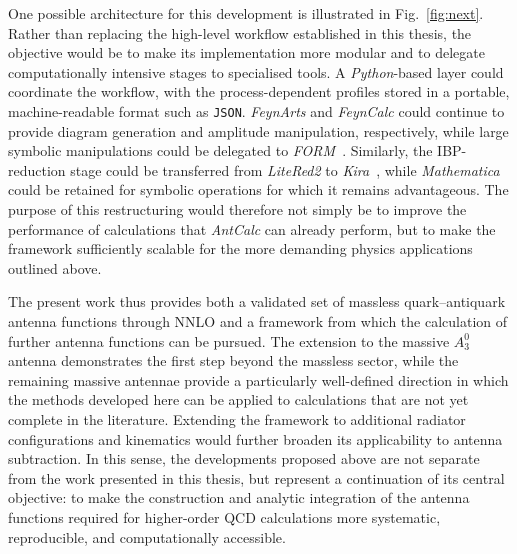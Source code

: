 One possible architecture for this development is illustrated in Fig.~\ref{fig:next}. Rather than
replacing the high-level workflow established in this thesis, the objective would be to make its
implementation more modular and to delegate computationally intensive stages to specialised tools. A
\textit{Python}-based layer could coordinate the workflow, with the process-dependent profiles stored
in a portable, machine-readable format such as \texttt{JSON}. \textit{FeynArts} and \textit{FeynCalc}
could continue to provide diagram generation and amplitude manipulation, respectively, while large
symbolic manipulations could be delegated to \textit{FORM}~\cite{Ruijl:2017dtg}. Similarly, the IBP-reduction stage could
be transferred from \textit{LiteRed2} to \textit{Kira}~\cite{Klappert:2020nbg}, while \textit{Mathematica} could be retained
for symbolic operations for which it remains advantageous. The purpose of this restructuring would
therefore not simply be to improve the performance of calculations that \textit{AntCalc} can already
perform, but to make the framework sufficiently scalable for the more demanding physics applications
outlined above.



The present work thus provides both a validated set of massless quark--antiquark antenna functions
through NNLO and a framework from which the calculation of further antenna functions can be pursued.
The extension to the massive $A_3^0$ antenna demonstrates the first step beyond the massless sector,
while the remaining massive antennae provide a particularly well-defined direction in which the
methods developed here can be applied to calculations that are not yet complete in the literature.
Extending the framework to additional radiator configurations and kinematics would further broaden its
applicability to antenna subtraction. In this sense, the developments proposed above are not separate
from the work presented in this thesis, but represent a continuation of its central objective: to make
the construction and analytic integration of the antenna functions required for higher-order QCD
calculations more systematic, reproducible, and computationally accessible.
